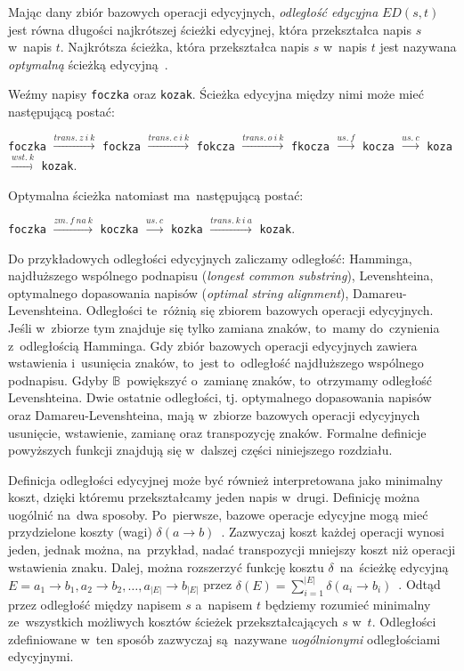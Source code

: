 \documentclass{praca1}
\begin{document}
\begin{definition}
Mając dany zbiór bazowych operacji edycyjnych, \emph{odległość edycyjna} $ED(s,t)$ jest równa długości najkrótszej ścieżki edycyjnej, która przekształca napis $s$ w~napis $t$. Najkrótsza ścieżka, która przekształca napis $s$ w~napis $t$ jest nazywana \emph{optymalną} ścieżką edycyjną~\cite{Boytsov2011:indexingmethods}. 
\end{definition}

\begin{example}
Weźmy napisy \verb|foczka| oraz \verb|kozak|. Ścieżka edycyjna między nimi może mieć następującą postać:

\verb|foczka|  $\xrightarrow{trans.\ z\ i\ k}$ \verb|fockza| $\xrightarrow{trans.\ c\ i\ k}$ \verb|fokcza| $\xrightarrow{trans.\ o\ i\ k}$ \verb|fkocza| $\xrightarrow{us.\ f}$ \verb|kocza| $\xrightarrow{us.\ c}$ \verb|koza| $\xrightarrow{wst.\ k}$ \verb|kozak|.

Optymalna ścieżka natomiast ma~następującą postać:

\verb|foczka| $\xrightarrow{zm.\ f\ na\ k}$ \verb|koczka|  $\xrightarrow{us.\ c}$ \verb|kozka| $\xrightarrow{trans.\ k\ i\ a}$ \verb|kozak|.

\end{example}

Do przykładowych odległości edycyjnych zaliczamy odległość: Hamminga, najdłuższego wspólnego podnapisu (\emph{longest common substring}), Levenshteina, optymalnego dopasowania napisów (\emph{optimal string alignment}), Damareu-Levenshteina. Odległości te~różnią się zbiorem bazowych operacji edycyjnych. Jeśli w~zbiorze tym znajduje się tylko zamiana znaków, to~mamy do~czynienia z~odległością Hamminga. Gdy zbiór bazowych operacji edycyjnych zawiera wstawienia i~usunięcia znaków, to~jest to~odległość najdłuższego wspólnego podnapisu. Gdyby $\mathbb{B}$~powiększyć o~zamianę znaków, to~otrzymamy odległość Levenshteina. Dwie ostatnie odległości, tj. optymalnego dopasowania napisów oraz Damareu-Levenshteina, mają w~zbiorze bazowych operacji edycyjnych usunięcie, wstawienie, zamianę oraz transpozycję znaków. Formalne definicje powyższych funkcji znajdują się w~dalszej części niniejszego rozdziału.




Definicja odległości edycyjnej może być również interpretowana jako minimalny koszt, dzięki któremu przekształcamy jeden napis w~drugi. Definicję można uogólnić na~dwa sposoby. Po~pierwsze, bazowe operacje edycyjne mogą mieć przydzielone koszty (wagi) $\delta(a \rightarrow b)$~\cite{Wagner1974:stringtostring}. Zazwyczaj koszt każdej operacji wynosi jeden, jednak można, na~przykład, nadać transpozycji mniejszy koszt niż operacji wstawienia znaku. Dalej, można rozszerzyć funkcję kosztu $\delta$~na~ścieżkę edycyjną $E = a_1 \rightarrow b_1, a_2 \rightarrow b_2, \ldots, a_{|E|} \rightarrow b_{|E|}$ przez $\delta(E) = \sum\limits_{i=1}^{|E|}\delta(a_i \rightarrow b_i)$~\cite{Boytsov2011:indexingmethods}. Odtąd przez odległość między napisem $s$ a~napisem $t$ będziemy rozumieć minimalny ze~wszystkich możliwych kosztów ścieżek przekształcających $s$ w~$t$. Odległości zdefiniowane w~ten sposób zazwyczaj są~nazywane \emph{uogólnionymi} odległościami edycyjnymi.
\end{document}
